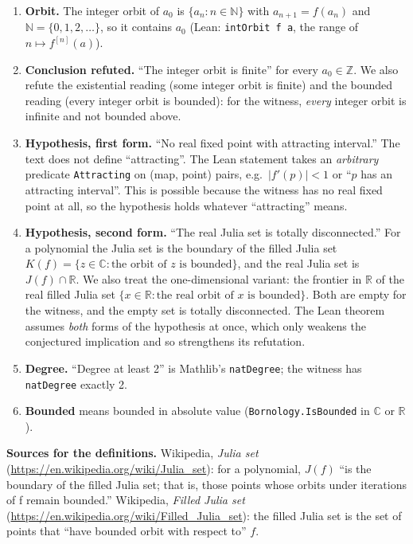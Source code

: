\documentclass[11pt]{article}
\renewcommand{\_}{\oldus\allowbreak}
\theoremstyle{definition}
\theoremstyle{remark}
\newcommand{\Z}{\mathbb{Z}}
\newcommand{\R}{\mathbb{R}}
\newcommand{\C}{\mathbb{C}}
\newcommand{\N}{\mathbb{N}}
\begin{document}
\begin{enumerate}[label=(\alph*)]
\item \textbf{Orbit.} The integer orbit of $a_0$ is $\{a_n : n \in \N\}$ with $a_{n+1} = f(a_n)$ and
$\N = \{0,1,2,\dots\}$, so it contains $a_0$ (Lean: \texttt{intOrbit f a}, the range of
$n \mapsto f^{[n]}(a)$).
\item \textbf{Conclusion refuted.} ``The integer orbit is finite'' for every $a_0 \in \Z$. We also refute
the existential reading (some integer orbit is finite) and the bounded reading (every integer orbit is
bounded): for the witness, \emph{every} integer orbit is infinite and not bounded above.
\item \textbf{Hypothesis, first form.} ``No real fixed point with attracting interval.'' The text does not
define ``attracting''. The Lean statement takes an \emph{arbitrary} predicate
\texttt{Attracting} on (map, point) pairs, e.g.\ $|f'(p)|<1$ or ``$p$ has an attracting interval''. This
is possible because the witness has no real fixed point at all, so the hypothesis holds whatever
``attracting'' means.
\item \textbf{Hypothesis, second form.} ``The real Julia set is totally disconnected.'' For a polynomial
the Julia set is the boundary of the filled Julia set $K(f) = \{z \in \C : \text{the orbit of } z \text{ is
bounded}\}$, and the real Julia set is $J(f) \cap \R$. We also treat the one-dimensional variant: the
frontier in $\R$ of the real filled Julia set $\{x \in \R : \text{the real orbit of } x \text{ is
bounded}\}$. Both are empty for the witness, and the empty set is totally disconnected. The Lean
theorem assumes \emph{both} forms of the hypothesis at once, which only weakens the conjectured
implication and so strengthens its refutation.
\item \textbf{Degree.} ``Degree at least 2'' is Mathlib's \texttt{natDegree}; the witness has
\texttt{natDegree} exactly 2.
\item \textbf{Bounded} means bounded in absolute value (\texttt{Bornology.IsBounded} in $\C$ or $\R$).
\end{enumerate}

\noindent\textbf{Sources for the definitions.} Wikipedia, \emph{Julia set}
(\url{https://en.wikipedia.org/wiki/Julia_set}): for a polynomial, $J(f)$ ``is the boundary of the
filled Julia set; that is, those points whose orbits under iterations of f remain bounded.''
Wikipedia, \emph{Filled Julia set} (\url{https://en.wikipedia.org/wiki/Filled_Julia_set}): the
filled Julia set is the set of points that ``have bounded orbit with respect to'' $f$.
\end{document}
